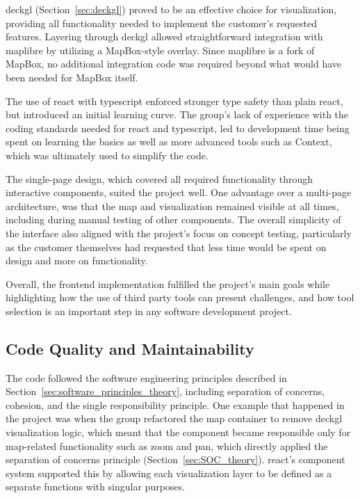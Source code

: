 \gls{deckgl} (Section~\ref{sec:deckgl}) proved to be an effective choice for visualization, providing all functionality needed to implement the customer's requested features. Layering through \gls{deckgl} allowed straightforward integration with \gls{maplibre} by utilizing a MapBox-style overlay. Since \gls{maplibre} is a fork of MapBox, no additional integration code was required beyond what would have been needed for MapBox itself. 

The use of \gls{react} with \gls{typescript} enforced stronger type safety than plain \gls{react}, but introduced an initial learning curve. The group's lack of experience with the coding standards needed for \gls{react} and \gls{typescript}, led to development time being spent on learning the basics as well as more advanced tools such as Context, which was ultimately used to simplify the code.  

The single-page design, which covered all required functionality through interactive components, suited the project well. One advantage over a multi-page architecture, was that the map and visualization remained visible at all times, including during manual testing of other components. The overall simplicity of the interface also aligned with the project's focus on concept testing, particularly as the customer themselves had requested that less time would be spent on design and more on functionality.
 
Overall, the frontend implementation fulfilled the project's main goals while highlighting how the use of third party tools can present challenges, and how tool selection is an important step in any software development project. 

\subsection{Code Quality and Maintainability}

The code followed the software engineering principles described in Section~\ref{sec:software_principles_theory}, including separation of concerns, cohesion, and the single responsibility principle. One example that happened in the project was when the group refactored the map container to remove \gls{deckgl} visualization logic, which meant that the component became responsible only for map-related functionality such as zoom and pan, which directly applied the separation of concerns principle (Section~\ref{sec:SOC_theory}). \gls{react}'s component system supported this by allowing each visualization layer to be defined as a separate functions with singular purposes.

